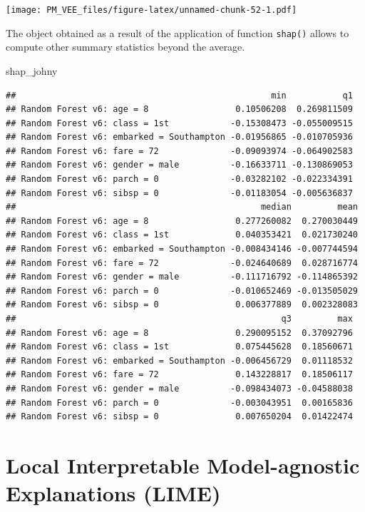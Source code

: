 \documentclass[12pt,]{krantz}
\newenvironment{Shaded}{\begin{snugshade}}{\end{snugshade}}
\newcommand{\NormalTok}[1]{#1}
\begin{document}
\texttt{[image: PM\_VEE\_files/figure-latex/unnamed-chunk-52-1.pdf]}

The object obtained as a result of the application of function \texttt{shap()} allows to compute other summary statistics beyond the average.

\begin{Shaded}
\begin{Highlighting}[]
\NormalTok{shap_johny}
\end{Highlighting}
\end{Shaded}

\begin{verbatim}
##                                                  min           q1
## Random Forest v6: age = 8                 0.10506208  0.269811509
## Random Forest v6: class = 1st            -0.15308473 -0.055009515
## Random Forest v6: embarked = Southampton -0.01956865 -0.010705936
## Random Forest v6: fare = 72              -0.09093974 -0.064902583
## Random Forest v6: gender = male          -0.16633711 -0.130869053
## Random Forest v6: parch = 0              -0.03282102 -0.022334391
## Random Forest v6: sibsp = 0              -0.01183054 -0.005636837
##                                                median         mean
## Random Forest v6: age = 8                 0.277260082  0.270030449
## Random Forest v6: class = 1st             0.040353421  0.021730240
## Random Forest v6: embarked = Southampton -0.008434146 -0.007744594
## Random Forest v6: fare = 72              -0.024640689  0.028716774
## Random Forest v6: gender = male          -0.111716792 -0.114865392
## Random Forest v6: parch = 0              -0.010652469 -0.013505029
## Random Forest v6: sibsp = 0               0.006377889  0.002328083
##                                                    q3         max
## Random Forest v6: age = 8                 0.290095152  0.37092796
## Random Forest v6: class = 1st             0.075445628  0.18560671
## Random Forest v6: embarked = Southampton -0.006456729  0.01118532
## Random Forest v6: fare = 72               0.143228817  0.18506117
## Random Forest v6: gender = male          -0.098434073 -0.04588038
## Random Forest v6: parch = 0              -0.003043951  0.00165836
## Random Forest v6: sibsp = 0               0.007650204  0.01422474
\end{verbatim}

\hypertarget{LIME}{%
\section{Local Interpretable Model-agnostic Explanations (LIME)}\label{LIME}}
\end{document}
